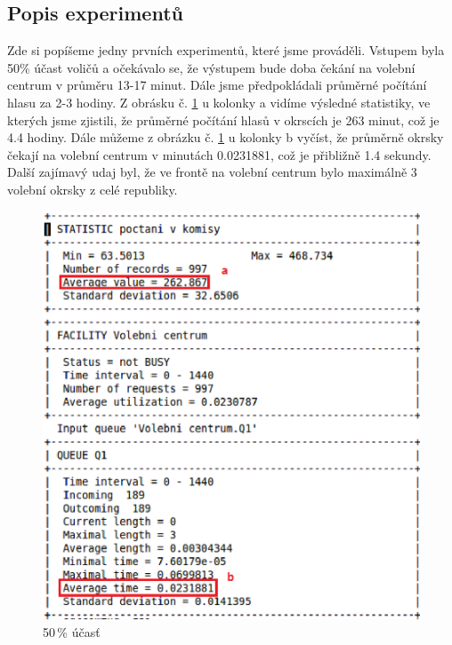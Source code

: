 \documentclass[12pt,a4paper,titlepage,final]{article}
\begin{document}
\subsection{Popis experimentů}
Zde si popíšeme jedny prvních experimentů, které jsme prováděli.
Vstupem byla 50\% účast voličů a očekávalo se, že výstupem bude doba čekání na volební centrum v průměru 13-17 minut. Dále jsme předpokládali průměrné počítání hlasu za 2-3 hodiny. Z obrásku č. \ref{obr3} u kolonky a vidíme výsledné statistiky, ve kterých jsme zjistili, že průměrné počítání hlasů v okrscích je 263 minut, což je 4.4 hodiny. Dále můžeme z obrázku č. \ref{obr3} u kolonky b vyčíst, že průměrně okrsky čekají na volební centrum v minutách 0.0231881, což je přibližně 1.4 sekundy. Další zajímavý udaj byl, že ve frontě na volební centrum bylo maximálně 3 volební okrsky z celé republiky. \newline
\begin{figure}[h]

\begin{center}

\includegraphics[scale=0.7]{img/0_5.eps} 
\caption{50\,\% účasť}
\label{obr3}

\end{center}

\end{figure}
\end{document}
